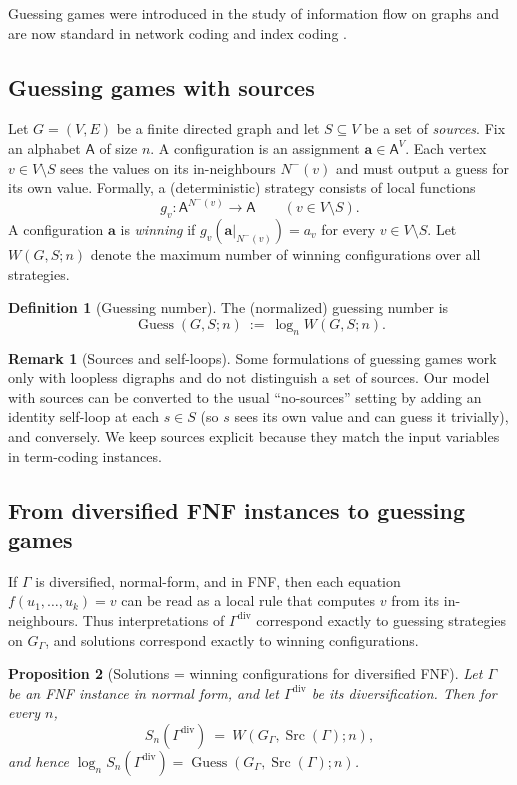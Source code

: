 \documentclass[11pt]{article}
\newcommand{\parencite}[1]{\citep{#1}}
\theoremstyle{definition}
\newtheorem{definition}{Definition}[section]
\newtheorem{remark}{Remark}[section]
\theoremstyle{plain}
\newtheorem{proposition}[definition]{Proposition}
\newcommand{\A}{\mathsf{A}}
\newcommand{\Sn}{S_n}
\DeclareMathOperator{\Guess}{Guess}
\DeclareMathOperator{\Src}{Src}
\begin{document}
Guessing games were introduced in the study of information flow on graphs and are now standard in network
coding and index coding \parencite{riis2006information,riis2007graph,gadouleau2011graph}.

\subsection{Guessing games with sources}
Let $G=(V,E)$ be a finite directed graph and let $S\subseteq V$ be a set of \emph{sources}.
Fix an alphabet $\A$ of size $n$.
A configuration is an assignment $\mathbf a\in \A^{V}$.
Each vertex $v\in V\setminus S$ sees the values on its in-neighbours $N^-(v)$ and must output a guess for its
own value.  Formally, a (deterministic) strategy consists of local functions
\[
g_v:\A^{N^-(v)}\to \A\qquad (v\in V\setminus S).
\]
A configuration $\mathbf a$ is \emph{winning} if $g_v(\mathbf a|_{N^-(v)})=a_v$ for every $v\in V\setminus S$.
Let $W(G,S;n)$ denote the maximum number of winning configurations over all strategies.

\begin{definition}[Guessing number]
The (normalized) guessing number is
\[
\Guess(G,S;n)\ :=\ \log_n W(G,S;n).
\]
\end{definition}

\begin{remark}[Sources and self-loops]
Some formulations of guessing games work only with loopless digraphs and do not distinguish a set of
sources.  Our model with sources can be converted to the usual ``no-sources'' setting by adding an
identity self-loop at each $s\in S$ (so $s$ sees its own value and can guess it trivially), and conversely.
We keep sources explicit because they match the input variables in term-coding instances.
\end{remark}

\subsection{From diversified FNF instances to guessing games}
If $\Gamma$ is diversified, normal-form, and in FNF, then each equation
$f(u_1,\dots,u_k)=v$ can be read as a local rule that computes $v$ from its in-neighbours.
Thus interpretations of $\Gamma^{\mathrm{div}}$ correspond exactly to guessing strategies on $G_\Gamma$, and
solutions correspond exactly to winning configurations.

\begin{proposition}[Solutions = winning configurations for diversified FNF]
\label{prop:solutions-winning}
Let $\Gamma$ be an FNF instance in normal form, and let $\Gamma^{\mathrm{div}}$ be its diversification.
Then for every $n$,
\[
\Sn(\Gamma^{\mathrm{div}})\ =\ W(G_\Gamma,\Src(\Gamma);n),
\]
and hence $\log_n \Sn(\Gamma^{\mathrm{div}})=\Guess(G_\Gamma,\Src(\Gamma);n)$.
\end{proposition}
\end{document}
